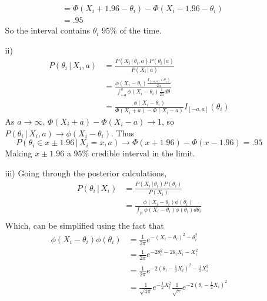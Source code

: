 \documentclass[11pt]{article}
\newcommand{\R}{\mathbb{R}}
\theoremstyle{definition}
\begin{document}
\begin{itemize}
\begin{itemize}
\begin{align*}
                                                                    &= \Phi(X_i+1.96-\theta_i) - \Phi(X_i-1.96-\theta_i) \\
                                                                    &= .95
                \end{align*}
                So the interval contains $\theta_i$ $95\%$ of the time.
            \item[ii)]
                \begin{align*}
                    P(\theta_i \,|\, X_i, a) &= \frac{P(X_i \,|\, \theta_i, a) P(\theta_i \,|\, a)}{P(X_i \,|\, a)} \\
                                             &= \frac{\phi(X_i-\theta_i) \frac{I_{[-a,a]}(\theta_i)}{2a}}{\int_{-a}^a \phi(X_i-\theta_i) \frac{1}{2a}d\theta} \\
                    &= \frac{\phi(X_i-\theta_i)}{\Phi(X_i+a)-\Phi(X_i-a)}I_{[-a,a]}(\theta_i)
                \end{align*}
                As $a\to \infty$, \(\Phi(X_i+a)-\Phi(X_i-a)\to 1\), so \(P(\theta_i \,|\, X_i, a)\to \phi(X_i-\theta_i)\). Thus
                \[ P(\theta_i \in x \pm 1.96 \,|\, X_i = x,a) \to \Phi(x + 1.96) - \Phi(x - 1.96) = .95 \]
                Making \(x\pm 1.96\) a  $95\%$ credible interval in the limit. 
            \item[iii)]
                Going through the posterior calculations,
                \begin{align*}
                    P(\theta_i \,|\, X_i) &= \frac{P(X_i \,|\, \theta_i) P(\theta_i)}{P(X_i)} \\
                                          &= \frac{\phi(X_i-\theta_i) \phi(\theta_i)}{\int_\R \phi(X_i-\theta_i) \phi(\theta_i)d\theta_i} \\
                \end{align*}
                Which, can be simplified using the fact that
                \begin{align*}
                    \phi(X_i-\theta_i) \phi(\theta_i) &= \frac{1}{2\pi}e^{-(X_i-\theta_i)^2 - \theta_i^2} \\
                                                      &= \frac{1}{2\pi}e^{-2\theta_i^2 - 2\theta_i X_i - X_i^2} \\
                                                      &= \frac{1}{2\pi}e^{-2(\theta_i- \frac{1}{2} X_i)^2 - \frac{1}{2}X_i^2} \\
                                                      &= \frac{1}{\sqrt{4\pi}}e^{- \frac{1}{2}X_i^2}\frac{1}{\sqrt{\pi}}e^{-2(\theta_i- \frac{1}{2} X_i)^2} \\

\end{align*}
\end{itemize}
\end{itemize}
\end{document}
